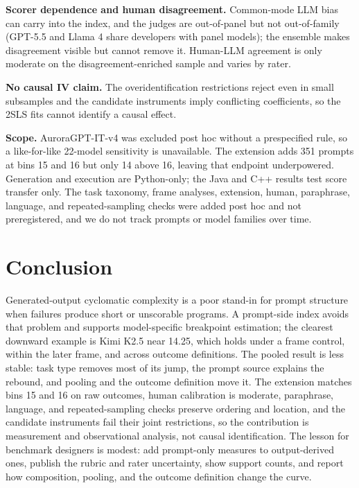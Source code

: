 \documentclass{article}
\begin{document}
\textbf{Scorer dependence and human disagreement.} Common-mode LLM bias can carry into the index, and the judges are out-of-panel but not out-of-family (GPT-5.5 and Llama 4 share developers with panel models); the ensemble makes disagreement visible but cannot remove it. Human-LLM agreement is only moderate on the disagreement-enriched sample and varies by rater.

\textbf{No causal IV claim.} The overidentification restrictions reject even in small subsamples and the candidate instruments imply conflicting coefficients, so the 2SLS fits cannot identify a causal effect.

\textbf{Scope.} AuroraGPT-IT-v4 was excluded post hoc without a prespecified rule, so a like-for-like 22-model sensitivity is unavailable. The extension adds 351 prompts at bins 15 and 16 but only 14 above 16, leaving that endpoint underpowered. Generation and execution are Python-only; the Java and C++ results test score transfer only. The task taxonomy, frame analyses, extension, human, paraphrase, language, and repeated-sampling checks were added post hoc and not preregistered, and we do not track prompts or model families over time.

\section{Conclusion}

Generated-output cyclomatic complexity is a poor stand-in for prompt structure when failures produce short or unscorable programs. A prompt-side index avoids that problem and supports model-specific breakpoint estimation; the clearest downward example is Kimi K2.5 near 14.25, which holds under a frame control, within the later frame, and across outcome definitions. The pooled result is less stable: task type removes most of its jump, the prompt source explains the rebound, and pooling and the outcome definition move it. The extension matches bins 15 and 16 on raw outcomes, human calibration is moderate, paraphrase, language, and repeated-sampling checks preserve ordering and location, and the candidate instruments fail their joint restrictions, so the contribution is measurement and observational analysis, not causal identification. The lesson for benchmark designers is modest: add prompt-only measures to output-derived ones, publish the rubric and rater uncertainty, show support counts, and report how composition, pooling, and the outcome definition change the curve.
\end{document}
